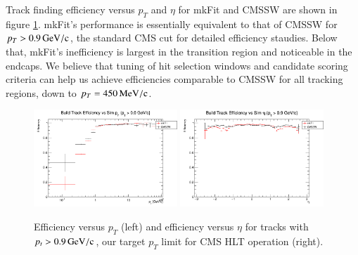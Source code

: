 \documentclass{webofc}
\def\mkfit{mkFit\xspace}
\def\MeVoc{\ensuremath{\,\rm{M}e\rm{V}/c}}
\def\GeVoc{\ensuremath{\,\rm{G}e\rm{V}/c}}
\def\twop{0.48\textwidth}
\def\postfigskip{\vskip-4mm}
\begin{document}
Track finding efficiency versus $p_T$ and $\eta$ for \mkfit and CMSSW are shown
in figure \ref{fig:eff-pt-etapt0p9}. \mkfit's performance is essentially
equivalent to that of CMSSW for $p_T > 0.9\GeVoc$, the standard CMS cut for detailed
efficiency staudies. Below that, \mkfit's
inefficiency is largest in the transition region and noticeable in the
endcaps. We believe that tuning of hit selection windows and candidate scoring
criteria can help us achieve efficiencies comparable to CMSSW for all tracking
regions, down to $p_T = 450\MeVoc$.

\begin{figure}[thb]
  \centering
  \includegraphics[width=\twop]{figs/phys/SKL-SP_CMSSW_TTbar_PU70_eff_pt_logx_build_pt0p0_SIMVAL.png}
  \hfill
  \includegraphics[width=\twop]{figs/phys/SKL-SP_CMSSW_TTbar_PU70_eff_eta_build_pt0p9_SIMVAL.png}
  \postfigskip

  \caption{Efficiency versus $p_T$ (left) and efficiency versus $\eta$ for
    tracks with $p_t>0.9\GeVoc$, our target $p_T$ limit for CMS HLT operation (right).}
  \label{fig:eff-pt-etapt0p9}
\end{figure}
\end{document}
